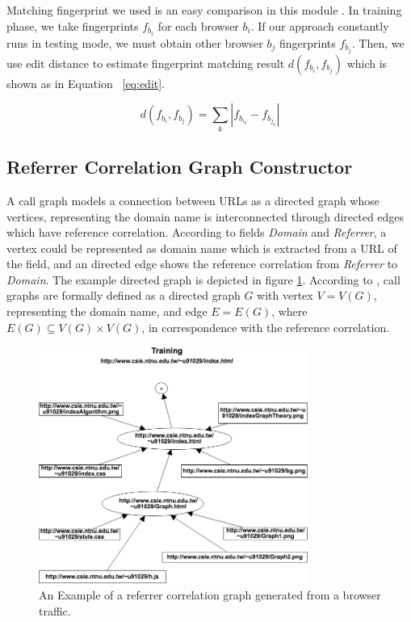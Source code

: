 Matching fingerprint we used is an easy comparison in this module \cite{bortolameotti2017decanter}. In training phase, we take fingerprints $f_{b_{i}}$ for each browser $b_{i}$. If our approach constantly runs in testing mode, we must obtain other browser $b_{j}$ fingerprints $f_{b_{j}}$. Then, we use edit distance to estimate fingerprint matching result $d(f_{b_{i}}, f_{b_{j}}) $ which is shown as in Equation ~\ref{eq:edit}.

\begin{equation}
        \label{eq:edit}
        d(f_{b_{i}}, f_{b_{j}}) = \sum_k \left |  f_{b_{i_{k}}} - f_{b_{j_{k}}} \right |  
\end{equation}

\subsection{Referrer Correlation Graph Constructor}

A call graph models a connection between URLs as a directed graph whose vertices, representing the domain name is interconnected through directed edges which have reference correlation. According to fields {\em Domain} and {\em Referrer}, a vertex could be represented as domain name which is extracted from a URL of the field, and an directed edge shows the reference correlation from {\em Referrer} to {\em Domain}. The example directed graph is depicted in figure \ref{fig:ref_graph}. According to \cite{kinable2011malware}, call graphs are formally defined as a directed graph $G$ with vertex $V = V(G)$, representing the domain name, and edge $E = E(G)$, where $E(G) \subseteq V(G) \times V(G) $, in correspondence with the reference correlation.

\begin{figure}[!t]
\centering
\includegraphics[width=250pt]{image/ref_graph.png}
\caption{An Example of a referrer correlation graph generated from a browser traffic.}
\label{fig:ref_graph}
\end{figure}

